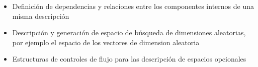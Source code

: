 \begin{itemize}
\begin{itemize}
              \item Definición de dependencias y relaciones entre los componentes internos de una misma descripción
              \item Descripción y generación de espacio de búsqueda de dimensiones aleatorias, por ejemplo el espacio
                    de los vectores de dimension aleatoria
              \item Estructuras de controles de flujo para las descripción de espacios opcionales
          \end{itemize}

\end{itemize}



\newcommand*\rot{\rotatebox{90}}
\newcommand*\OK{\ding{51}}



